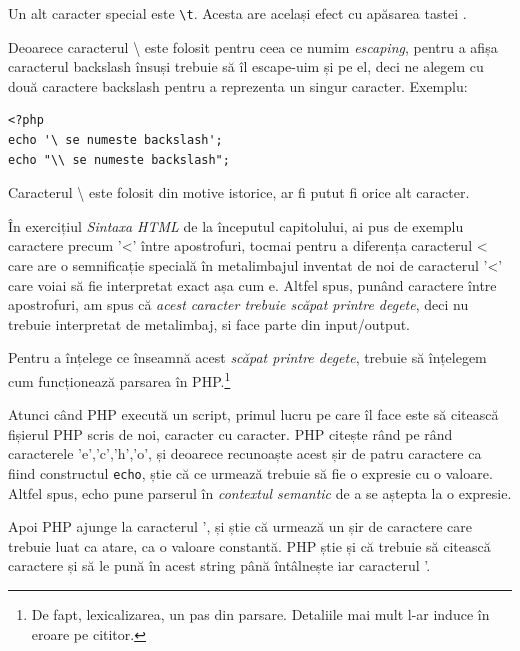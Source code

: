Un alt caracter special este \texttt{{\textbackslash}t}.
Acesta are același efect cu apăsarea tastei .

Deoarece caracterul {\textbackslash} este folosit pentru ceea
ce numim \textsl{escaping}, pentru a afișa caracterul backslash
însuși trebuie să îl escape-uim și pe el, deci ne alegem cu
două caractere backslash pentru a reprezenta un singur caracter.
Exemplu:
\begin{lstlisting}
<?php
echo '\ se numeste backslash';
echo "\\ se numeste backslash";
\end{lstlisting}

Caracterul {\textbackslash} este folosit din motive istorice,
ar fi putut fi orice alt caracter.

În exercițiul \textit{Sintaxa HTML} de la începutul
capitolului, ai pus de exemplu caractere precum '<' între
apostrofuri, tocmai pentru a diferența caracterul < care are
o semnificație specială în metalimbajul inventat de noi de
caracterul '<' care voiai să fie interpretat exact așa cum e.
Altfel spus, punând caractere între apostrofuri, am spus
că \textit{acest caracter trebuie {\glqq}scăpat printre degete{\grqq}}, deci
nu trebuie interpretat de metalimbaj, si face parte din input/output.

Pentru a înțelege ce înseamnă acest \textit{scăpat printre degete},
trebuie să înțelegem cum funcționează parsarea în PHP.\footnote{De fapt,
lexicalizarea, un pas din {\glqq}parsare{\grqq}. Detaliile mai mult l-ar
induce în eroare pe cititor.}

Atunci când PHP {\glqq}execută{\grqq} un script, primul lucru pe care îl
face este să citească fișierul PHP scris de noi, caracter
cu caracter. PHP citește rând pe rând caracterele 'e','c','h','o',
și deoarece recunoaște acest șir de patru caractere ca fiind
constructul \texttt{echo}, știe că ce urmează trebuie să
fie o expresie cu o valoare. Altfel spus, {\glqq}echo{\grqq} pune
parserul în \textsl{contextul semantic} de a se aștepta la o
expresie.

Apoi PHP ajunge la caracterul ', și știe că urmează
un șir de caractere care trebuie luat ca atare, ca o valoare
constantă. PHP știe și că trebuie să citească caractere și
să le pună în acest string până întâlnește iar caracterul '.


